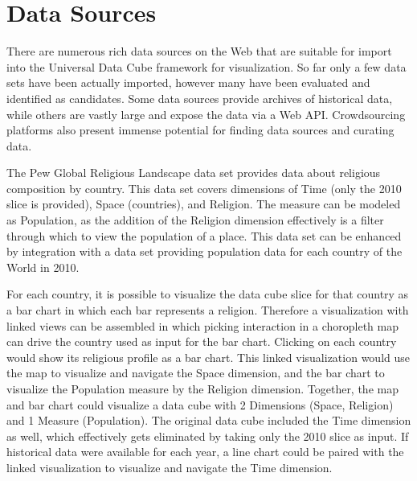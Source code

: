 \begin{table}
\begin{tabular}{ | c | c | c |}

  \end{tabular}
\end{table}

\section{Data Sources}

There are numerous rich data sources on the Web that are suitable for import into the Universal Data Cube framework for visualization. So far only a few data sets have been actually imported, however many have been evaluated and identified as candidates. Some data sources provide archives of historical data, while others are vastly large and expose the data via a Web API. Crowdsourcing platforms also present immense potential for finding data sources and curating data.

The Pew Global Religious Landscape data set provides data about religious composition by country. This data set covers dimensions of Time (only the 2010 slice is provided), Space (countries), and Religion. The measure can be modeled as Population, as the addition of the Religion dimension effectively is a filter through which to view the population of a place. This data set can be enhanced by integration with a data set providing population data for each country of the World in 2010.

For each country, it is possible to visualize the data cube slice for that country as a bar chart in which each bar represents a religion. Therefore a visualization with linked views can be assembled in which picking interaction in a choropleth map can drive the country used as input for the bar chart. Clicking on each country would show its religious profile as a bar chart. This linked visualization would use the map to visualize and navigate the Space dimension, and the bar chart to visualize the Population measure by the Religion dimension. Together, the map and bar chart could visualize a data cube with 2 Dimensions (Space, Religion) and 1 Measure (Population). The original data cube included the Time dimension as well, which effectively gets eliminated by taking only the 2010 slice as input. If historical data were available for each year, a line chart could be paired with the linked visualization to visualize and navigate the Time dimension.

